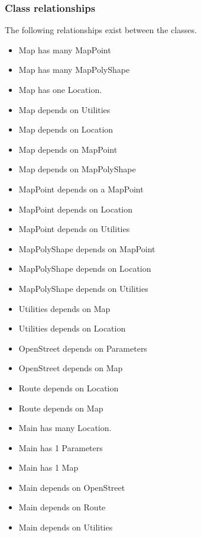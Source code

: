 \documentclass[11pt,twoside,a4paper]{article}
\begin{document}
\subsubsection{Class relationships}
The following relationships exist between the classes.
\begin{itemize}
\item Map has many MapPoint
\item Map has many MapPolyShape
\item Map has one Location.
\item Map depends on Utilities
\item Map depends on Location
\item Map depends on MapPoint
\item Map depends on MapPolyShape
\end{itemize}
\begin{itemize}
\item MapPoint depends on a MapPoint
\item MapPoint depends on Location
\item MapPoint depends on Utilities 
\end{itemize}
\begin{itemize}
\item MapPolyShape depends on MapPoint
\item MapPolyShape depends on Location
\item MapPolyShape depends on Utilities 
\end{itemize}
\begin{itemize}
\item Utilities depends on Map
\item Utilities depends on Location 
\end{itemize}
\begin{itemize}
\item OpenStreet depends on Parameters
\item OpenStreet depends on Map
\end{itemize}
\begin{itemize}
\item Route depends on Location
\item Route depends on Map
\end{itemize}
\begin{itemize}
\item Main has many Location.
\item Main has 1 Parameters
\item Main has 1 Map
\item Main depends on OpenStreet
\item Main depends on Route
\item Main depends on Utilities 
\end{itemize}
\end{document}
